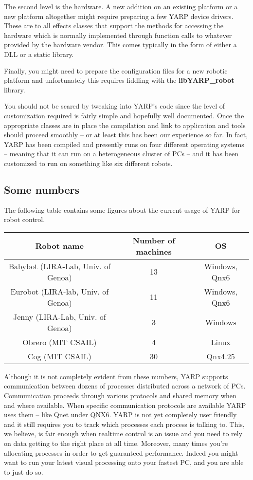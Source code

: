 The second level is the hardware. A new addition on an existing platform or a new platform altogether might require preparing a few YARP device drivers. These are to all effects classes that support the methods for accessing the hardware which is normally implemented through function calls to whatever provided by the hardware vendor. This comes typically in the form of either a DLL or a static library.

Finally, you might need to prepare the configuration files for a new robotic platform and unfortunately this requires fiddling with the {\bf libYARP\_robot} library.

You should not be scared by tweaking into YARP's code since the level of customization required is fairly simple and hopefully well documented. Once the appropriate classes are in place the compilation and link to application and tools should proceed smoothly -- or at least this has been our experience so far. In fact, YARP has been compiled and presently runs on four different operating systems -- meaning that it can run on a heterogeneous cluster of PCs -- and it has been customized to run on something like six different robots.

\subsection{Some numbers}
The following table contains some figures about the current usage of YARP for robot control.
\begin{table}[h]
	\centering
		\begin{tabular}{|c|c|c|}
		\hline
			Robot name & Number of machines & OS \\
			\hline \hline
			Babybot (LIRA-Lab, Univ. of Genoa) & 13 & Windows, Qnx6 \\
			\hline
			Eurobot (LIRA-lab, Univ. of Genoa) & 11 & Windows, Qnx6 \\
			\hline
			Jenny (LIRA-Lab, Univ. of Genoa) & 3 & Windows \\
			\hline
			Obrero (MIT CSAIL) & 4 & Linux \\
			\hline
			Cog (MIT CSAIL) & 30 & Qnx4.25 \\
			\hline
		\end{tabular}
\end{table}

Although it is not completely evident from these numbers, YARP supports communication between dozens of processes distributed across a network of PCs. Communication proceeds through various protocols and shared memory when and where available. When specific communication protocols are available YARP uses them -- like Qnet under QNX6. YARP is not yet completely user friendly and it still requires you to track which processes each process is talking to. This, we believe, is fair enough when realtime control is an issue and you need to rely on data getting to the right place at all time. Moreover, many times you're allocating processes in order to get guaranteed performance. Indeed you might want to run your latest visual processing onto your fastest PC, and you are able to just do so.

